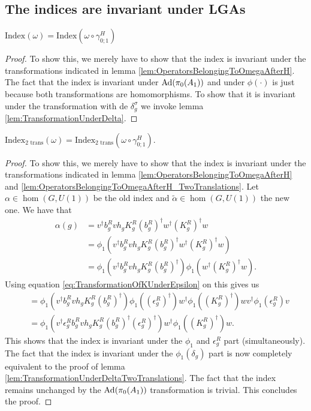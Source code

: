 \documentclass[11pt,a4paper,twoside]{article}
\numberwithin{equation}{section}
\begin{document}
	\subsection{The indices are invariant under LGAs}\label{sec:IndexInvariantUnderLGA}
	\begin{theorem}\label{thrm:IndexInvariantUnderLGA}
		$\textrm{Index}(\omega)=\textrm{Index}(\omega\circ\gamma^H_{0;1})$
	\end{theorem}
	\begin{proof}
		To show this, we merely have to show that the index is invariant under the transformations indicated in lemma \ref{lem:OperatorsBelongingToOmegaAfterH}. The fact that the index is invariant under $\Ad{\pi_0(A_1)}$ and under $\phi(\cdot)$ is just because both transformations are homomorphisms. To show that it is invariant under the transformation with de $\delta^\sigma_g$ we invoke lemma \ref{lem:TransformationUnderDelta}.
	\end{proof}
	\begin{theorem}\label{thrm:IndexInvariantUnderLGA_TwoTrans}
		$\textrm{Index}_{\text{2 trans}}(\omega)=\textrm{Index}_{\text{2 trans}}(\omega\circ\gamma^H_{0;1}).$
	\end{theorem}
	\begin{proof}
		To show this, we merely have to show that the index is invariant under the transformations indicated in lemma \ref{lem:OperatorsBelongingToOmegaAfterH} and \ref{lem:OperatorsBelongingToOmegaAfterH_TwoTranslations}. Let $\alpha\in\hom(G,U(1))$ be the old index and $\tilde{\alpha}\in\hom(G,U(1))$ the new one. We have that
		\begin{align}
			\alpha(g)&=v^\dagger b_g^R v h_g K_g^R (b_g^R)^\dagger w^\dagger (K_g^R)^\dagger w\\
			&=\phi_1(v^\dagger b_g^R v h_g K_g^R (b_g^R)^\dagger w^\dagger (K_g^R)^\dagger w)\\
			&=\phi_1(v^\dagger b_g^R v h_g K_g^R (b_g^R)^\dagger)\phi_1( w^\dagger (K_g^R)^\dagger w).
		\end{align}
		Using equation \eqref{eq:TransformationOfKUnderEpsilon} on this gives us
		\begin{align}
			&=\phi_1(v^\dagger b_g^R v h_g K_g^R (b_g^R)^\dagger)\phi_1((\epsilon_g^R)^\dagger)w^\dagger\phi_1(  (K_g^R)^\dagger )wv^\dagger \phi_1(\epsilon_g^R)v\\
			&=\phi_1(v^\dagger \epsilon_g^R b_g^R v h_g K_g^R (b_g^R)^\dagger (\epsilon_g^R)^\dagger)w^\dagger\phi_1(  (K_g^R)^\dagger )w.
		\end{align}
		This shows that the index is invariant under the $\phi_1$ and $\epsilon^R_g$ part (simultaneously). The fact that the index is invariant under the $\phi_1(\delta_g)$ part is now completely equivalent to the proof of lemma \ref{lem:TransformationUnderDeltaTwoTranslations}. The fact that the index remains unchanged by the $\Ad{\pi_0(A_1)}$ transformation is trivial. This concludes the proof.
	\end{proof}
\end{document}
